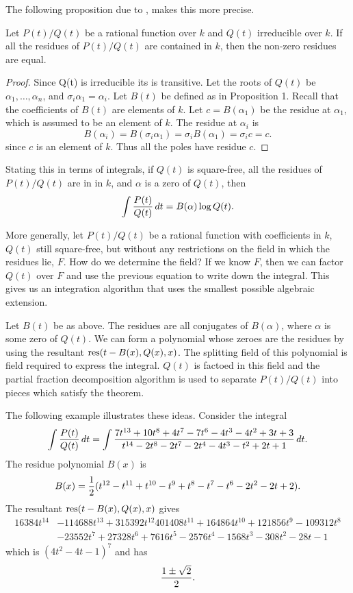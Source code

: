 The following proposition due to {\Trager} \cite{Trager1976-ri}, makes this
more precise.

\begin{proposition}[Trager]
Let $P(t)/Q(t)$ be a rational function over $k$ and $Q(t)$ irreducible
over $k$.  If all the residues of $P(t)/Q(t)$ are contained in $k$,
then the non-zero residues are equal.
\end{proposition}

\begin{proof}
Since Q(t) is irreducible its  is transitive.  Let
the roots of $Q(t)$ be $\alpha_1, \ldots, \alpha_n$, and $\sigma_i
\alpha_1 = \alpha_i$.  Let $B(t)$ be defined as in Proposition 1.
Recall that the coefficients of $B(t)$ are elements of $k$.  Let $c =
B(\alpha_1)$ be the residue at $\alpha_1$, which is assumed to be an
element of $k$.  The residue at $\alpha_i$ is
\[
B(\alpha_i) = B(\sigma_i \alpha_1) = \sigma_iB(\alpha_1)= \sigma_i c = c.
\]
since $c$ is an element of $k$.  Thus all the poles have residue $c$. 
\end{proof}

Stating this in terms of integrals, if $Q(t)$ is square-free, all the
residues of $P(t)/Q(t)$ are in in $k$, and $\alpha$ is a zero of $Q(t)$,
then
\[
\int {P(t) \over Q(t)} \, dt = B(\alpha) \log Q(t).
\]

More generally, let $P(t)/Q(t)$ be a rational function with coefficients in
$k$, $Q(t)$ still square-free, but without any restrictions on the field
in which the residues lie, $F$.  How do we determine the field?  If we know
$F$, then we can factor $Q(t)$ over $F$ and use the previous equation to
write down the integral.  This gives us an integration algorithm that uses
the smallest possible algebraic extension.

Let $B(t)$ be as above.  The residues are all conjugates of $B(\alpha)$,
where $\alpha$ is some zero of $Q(t)$.  We can form a polynomial whose
zeroes are the residues by using the resultant
$\mathop{\rm res}\nolimits(t - B(x), Q(x), x)$.  The splitting field of this polynomial is field
required to express the integral.  $Q(t)$ is factoed in this field and
the partial fraction decomposition algorithm is used to  separate
$P(t)/Q(t)$ into pieces which satisfy the theorem.  

The following example illustrates these ideas.  Consider the integral
\[
\int {P(t) \over Q(t)} \, dt =
\int {7 t^{13} + 10t^8 +4 t^7 - 7t^6 - 4t^3 - 4t^2 + 3t +3 \over
t^{14} - 2t^8 - 2t^7 - 2t^4 - 4t^3 - t^2 + 2t +1} \, dt.
\]
The residue polynomial $B(x)$ is
\[
B(x) = {1 \over 2} (t^{12} - t^{11} + t^{10} - t^9 + t^8 - t^7 - t^6 -
2t^2 - 2t +2).
\]
The resultant $\mathop{\rm res}\nolimits(t - B(x), Q(x), x)$ gives
\[
\begin{aligned}
  16384 t^{14} &- 114688 t^{13} + 315392 t^{12}
      401408 t^{11} + 164864 t^{10} + 121856 t^9 - 109312 t^8 \\
    & -23552 t^7 +27328 t^6 + 7616 t^5 - 2576 t^4 - 1568 t^3
      -308 t^2 - 28 t -1 
\end{aligned}
\]
which is $(4 t^2 - 4t -1)^7$ and has 
\[
{1 \pm \sqrt{2} \over 2}.
\]

